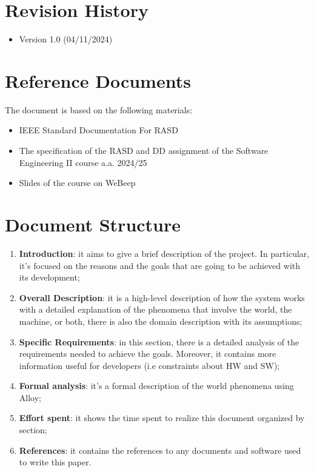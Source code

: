   
\section{Revision History}

\begin{itemize}
    \item Version 1.0 (04/11/2024)
\end{itemize}

\section{Reference Documents}

The document is based on the following materials:

\begin{itemize}
    \item IEEE Standard Documentation For RASD
    \item The specification of the RASD and DD assignment of the Software Engineering II course a.a. 2024/25 
    \item Slides of the course on WeBeep
\end{itemize}


\section{Document Structure}

\begin{enumerate}
    \item  \textbf{Introduction}: it aims to give a brief description of the project. In particular, it’s focused on the reasons and the goals that are going to be achieved with its development;
 
    \item \textbf{Overall Description}: it is a high-level description of how the system works with a detailed explanation of the phenomena that involve the world, the machine, or both, there is also the domain description with its assumptions;
 
    \item \textbf{Specific Requirements}: in this section, there is a detailed analysis of the requirements needed to achieve the goals. Moreover, it contains more information useful for developers (i.e constraints about HW and SW);
    
    \item \textbf{Formal analysis}: it’s a formal description of the world phenomena using Alloy;

    \item  \textbf{Effort spent}: it shows the time spent to realize this document organized by section;

    \item  \textbf{References}: it contains the references to any documents and software used to write this paper.
    
\end{enumerate}